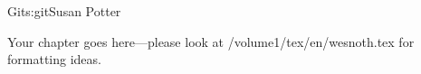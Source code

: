 \begin{aosachapter}{Git}{s:git}{Susan Potter}

Your chapter goes here---please look at /volume1/tex/en/wesnoth.tex for 
formatting ideas.

\end{aosachapter}
